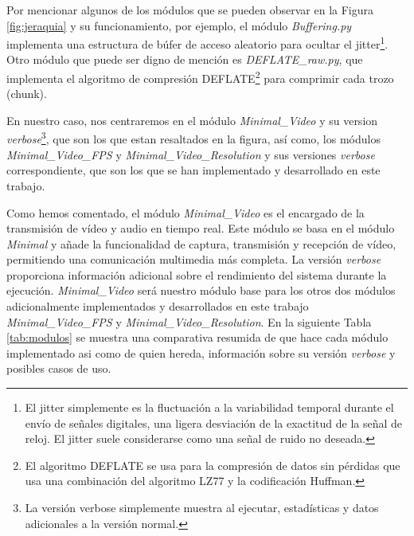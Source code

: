 Por mencionar algunos de los módulos que se pueden observar en la Figura \ref{fig:jeraquia} y su funcionamiento, por ejemplo, el módulo \textit{Buffering.py} implementa una estructura de búfer de acceso aleatorio para ocultar el jitter\footnote{El jitter simplemente es la fluctuación a la variabilidad temporal durante el envío de señales digitales, una ligera desviación de la exactitud de la señal de reloj. El jitter suele considerarse como una señal de ruido no deseada.}. Otro módulo que puede ser digno de mención es \textit{DEFLATE\_raw.py}, que implementa el algoritmo de compresión DEFLATE\footnote{El algoritmo DEFLATE se usa para la compresión de datos sin pérdidas que usa una combinación del algoritmo LZ77 y la codificación Huffman.} para comprimir cada trozo (chunk).

\vspace{\baselineskip}
En nuestro caso, nos centraremos en el módulo \textit{Minimal\_Video} y su version \textit{verbose}\footnote{La versión verbose simplemente muestra al ejecutar, estadísticas y datos adicionales a la versión normal.}, que son los que estan resaltados en la figura, así como, los módulos \textit{Minimal\_Video\_FPS} y \textit{Minimal\_Video\_Resolution} y sus versiones \textit{verbose} correspondiente, que son los que se han implementado y desarrollado en este trabajo.

\vspace{\baselineskip}
Como hemos comentado, el módulo \textit{Minimal\_Video} es el encargado de la transmisión de vídeo y audio en tiempo real. Este módulo se basa en el módulo \textit{Minimal} y añade la funcionalidad de captura, transmisión y recepción de vídeo, permitiendo una comunicación multimedia más completa. La versión \textit{verbose} proporciona información adicional sobre el rendimiento del sistema durante la ejecución. \textit{Minimal\_Video} será nuestro módulo base para los otros dos módulos adicionalmente implementados y desarrollados en este trabajo \textit{Minimal\_Video\_FPS} y \textit{Minimal\_Video\_Resolution}. En la siguiente Tabla \ref{tab:modulos} se muestra una comparativa resumida de que hace cada módulo implementado asi como de quien hereda, información sobre su versión \textit{verbose} y posibles casos de uso.

